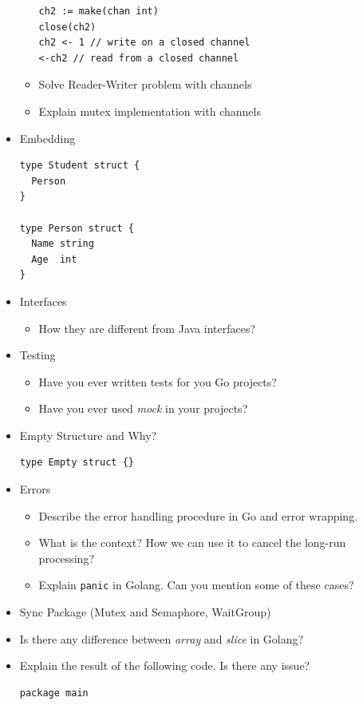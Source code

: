 \documentclass[]{article}
\begin{document}
\begin{multicols}{2}
\begin{itemize}
\begin{itemize}
\begin{verbatim}
ch2 := make(chan int)
close(ch2)
ch2 <- 1 // write on a closed channel
<-ch2 // read from a closed channel
          \end{verbatim}
        \item Solve Reader-Writer problem with channels
        \item Explain mutex implementation with channels
      \end{itemize}

    \item Embedding
      \begin{verbatim}
type Student struct {
  Person
}

type Person struct {
  Name string
  Age  int
}
      \end{verbatim}

    \item Interfaces
      \begin{itemize}
        \item How they are different from Java interfaces?
      \end{itemize}

    \item Testing
      \begin{itemize}
        \item Have you ever written tests for you Go projects?
        \item Have you ever used \textit{mock} in your projects?
      \end{itemize}

    \item Empty Structure and Why?
      \begin{verbatim}
type Empty struct {}
      \end{verbatim}

    \item Errors
      \begin{itemize}
        \item  Describe the error handling procedure in Go and error wrapping.
        \item What is the context? How we can use it to cancel the long-run processing?
        \item Explain \texttt{panic} in Golang. Can you mention some of these cases?
      \end{itemize}

    \item Sync Package (Mutex and Semaphore, WaitGroup)
    \item Is there any difference between \textit{\color{YellowOrange} array} and \textit{\color{YellowOrange} slice} in Golang?
    \item Explain the result of the following code. Is there any issue?
      \begin{verbatim}
package main


\end{verbatim}
\end{itemize}
\end{multicols}
\end{document}
